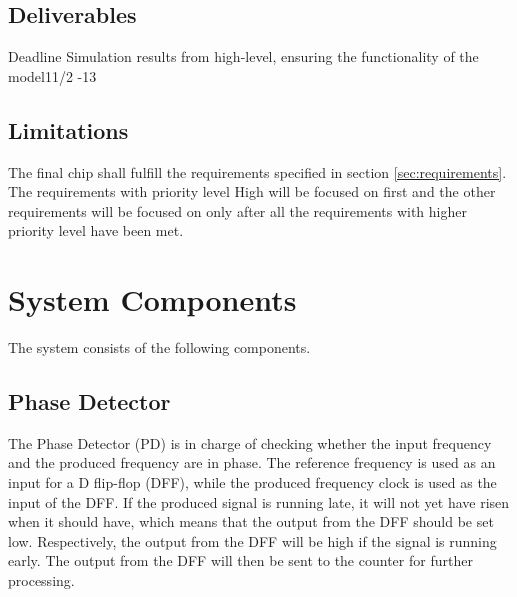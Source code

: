 \documentclass[a4paper,12pt]{article} \usepackage{graphicx}
\begin{document}
\subsection{Deliverables}

\begin{LIPSleveranslista}
                     {Deadline}
                     {Simulation results from high-level, ensuring the functionality of the model}{11/2 -13}
\end{LIPSleveranslista}


\subsection{Limitations}
The final chip shall fulfill the requirements specified in section
\ref{sec:requirements}.
The requirements with priority level High will be focused on first and the other
requirements
will be focused on only after all the requirements with higher priority level
have been met.

\section{System Components}

The system consists of the following components.

\subsection{Phase Detector}
The Phase Detector (PD) is in charge of checking whether the input frequency and the produced frequency are in phase. The reference frequency is used as an input for a D flip-flop (DFF), while the produced frequency clock is used as the input of the DFF. If the produced signal is running late, it will not yet have risen when it should have, which means that the output from the DFF should be set low. Respectively, the output from the DFF will be high if the signal is running early. The output from the DFF will then be sent to the counter for further processing.
\end{document}
